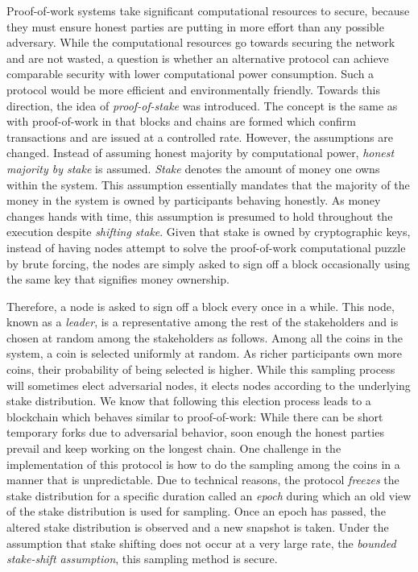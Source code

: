 Proof-of-work systems take significant computational resources to secure,
because they must ensure honest parties are putting in more effort than any
possible adversary. While the computational resources go towards securing the
network and are not wasted, a question is whether an alternative protocol can
achieve comparable security with lower computational power consumption. Such a
protocol would be more efficient and environmentally friendly. Towards this
direction, the idea of \emph{proof-of-stake} was introduced. The concept is the
same as with proof-of-work in that blocks and chains are formed which confirm
transactions and are issued at a controlled rate. However, the assumptions are
changed. Instead of assuming honest majority by computational power,
\emph{honest majority by stake} is assumed. \emph{Stake} denotes the amount of
money one owns within the system. This assumption essentially mandates that the
majority of the money in the system is owned by participants behaving honestly.
As money changes hands with time, this assumption is presumed to hold throughout
the execution despite \emph{shifting stake}. Given that stake is owned by
cryptographic keys, instead of having nodes attempt to solve the proof-of-work
computational puzzle by brute forcing, the nodes are simply asked to sign off
a block occasionally using the same key that signifies money ownership.

Therefore, a node is asked to sign off a block every once in a while. This node,
known as a \emph{leader}, is a representative among the rest of the stakeholders
and is chosen at random among the stakeholders as follows. Among all the coins
in the system, a coin is selected uniformly at random. As richer participants
own more coins, their probability of being selected is higher. While this
sampling process will sometimes elect adversarial nodes, it elects nodes
according to the underlying stake distribution. We know that following this
election process leads to a blockchain which behaves similar to proof-of-work:
While there can be short temporary forks due to adversarial behavior, soon
enough the honest parties prevail and keep working on the longest chain. One
challenge in the implementation of this protocol is how to do the sampling among
the coins in a manner that is unpredictable. Due to technical reasons, the
protocol \emph{freezes} the stake distribution for a specific duration called an
\emph{epoch} during which an old view of the stake distribution is used for
sampling. Once an epoch has passed, the altered stake distribution is observed
and a new snapshot is taken. Under the assumption that stake shifting does not
occur at a very large rate, the \emph{bounded stake-shift assumption}, this
sampling method is secure.
